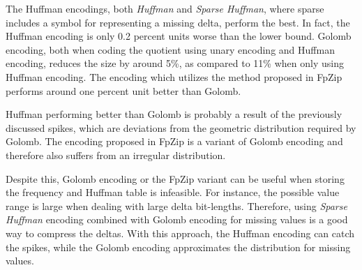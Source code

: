The Huffman encodings, both \emph{Huffman} and \emph{Sparse Huffman}, where sparse includes a symbol for representing a missing delta, perform the best. In fact, the Huffman encoding is only 0.2 percent units worse than the lower bound. Golomb encoding, both when coding the quotient using unary encoding and Huffman encoding, reduces the size by around 5\%, as compared to 11\% when only using Huffman encoding. The encoding which utilizes the method proposed in FpZip \cite{fpzip} performs around one percent unit better than Golomb.

Huffman performing better than Golomb is probably a result of the previously discussed spikes, which are deviations from the geometric distribution required by Golomb. The encoding proposed in FpZip is a variant of Golomb encoding and therefore also suffers from an irregular distribution.

Despite this, Golomb encoding or the FpZip variant can be useful when storing the frequency and Huffman table is infeasible. For instance, the possible value range is large when dealing with large delta bit-lengths. Therefore, using \emph{Sparse Huffman} encoding combined with Golomb encoding for missing values is a good way to compress the deltas. With this approach, the Huffman encoding can catch the spikes, while the Golomb encoding approximates the distribution for missing values.






